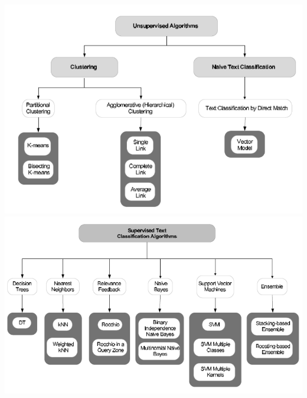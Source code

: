 \documentclass{report}
\begin{document}
	\begin{center}
		\includegraphics[scale=0.3]{assets/unsupervised-algo.png}
		\includegraphics[scale=0.3]{assets/supervised-algo.png}
	\end{center}
\end{document}

